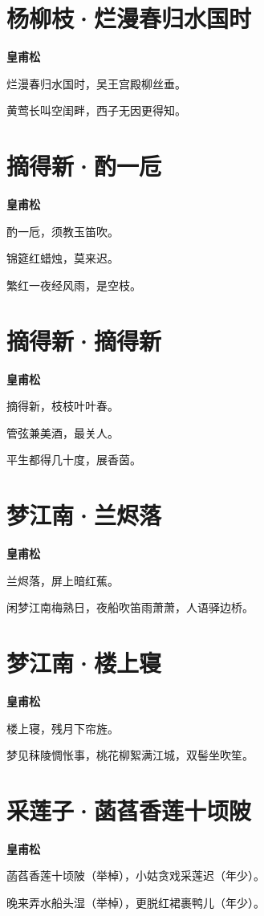 \documentclass[12pt,a4paper]{ctexbook}
\begin{document}
\section{杨柳枝·烂漫春归水国时}
\textbf{皇甫松}\par\vspace{0.5em}
烂漫春归水国时，吴王宫殿柳丝垂。\par
黄莺长叫空闺畔，西子无因更得知。\par

\section{摘得新·酌一卮}
\textbf{皇甫松}\par\vspace{0.5em}
酌一卮，须教玉笛吹。\par
锦筵红蜡烛，莫来迟。\par
繁红一夜经风雨，是空枝。\par

\section{摘得新·摘得新}
\textbf{皇甫松}\par\vspace{0.5em}
摘得新，枝枝叶叶春。\par
管弦兼美酒，最关人。\par
平生都得几十度，展香茵。\par

\section{梦江南·兰烬落}
\textbf{皇甫松}\par\vspace{0.5em}
兰烬落，屏上暗红蕉。\par
闲梦江南梅熟日，夜船吹笛雨萧萧，人语驿边桥。\par

\section{梦江南·楼上寝}
\textbf{皇甫松}\par\vspace{0.5em}
楼上寝，残月下帘旌。\par
梦见秣陵惆怅事，桃花柳絮满江城，双髻坐吹笙。\par

\section{采莲子·菡萏香莲十顷陂}
\textbf{皇甫松}\par\vspace{0.5em}
菡萏香莲十顷陂（举棹），小姑贪戏采莲迟（年少）。\par
晚来弄水船头湿（举棹），更脱红裙裹鸭儿（年少）。\par
\end{document}
